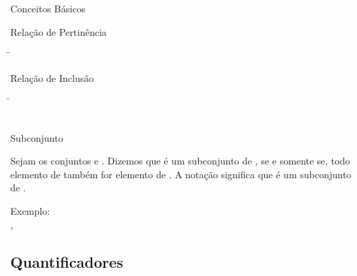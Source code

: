 \begin{frame}{Conceitos Básicos}
    \begin{block}{Relação de Pertinência}
    \begin{tabbing}
      \= \\
      \> 
    \end{tabbing}
  \end{block}
  \begin{block}{Relação de Inclusão}
    \begin{tabbing}
    \= \\ 
      \>\\
      \>
    \end{tabbing}
  \end{block}
    
\end{frame}

\begin{frame}{Subconjunto}

Sejam os conjuntos  e . Dizemos que 
 é um subconjunto de , se e somente se, 
todo elemento de  também for elemento de . 
A notação  significa que  é 
um subconjunto de .
  
Exemplo:\\

\bigskip
{},  

\end{frame}

\subsection{Quantificadores}

